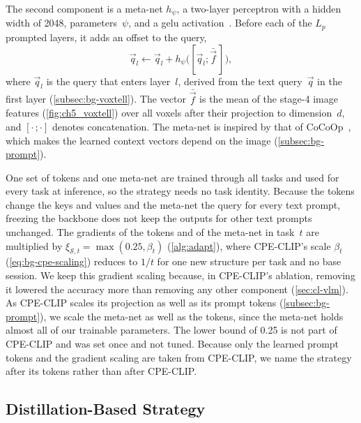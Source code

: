 The second component is a meta-net $h_\psi$, a two-layer perceptron with a hidden width of 2048, parameters~$\psi$, and a \gls{gelu} activation~\cite{hendrycks2016gelu}.
Before each of the $L_p$ prompted layers, it adds an offset to the query,
\begin{equation}
\vec{q}_l \leftarrow \vec{q}_l + h_\psi\big([\vec{q}_l; \bar{\vec{f}}\,]\big),
\label{eq:method-metanet}
\end{equation}
where $\vec{q}_l$ is the query that enters layer~$l$, derived from the text query~$\vec{q}$ in the first layer (\cref{subsec:bg-voxtell}).
The vector $\bar{\vec{f}}$ is the mean of the stage-4 image features (\cref{fig:ch5_voxtell}) over all voxels after their projection to dimension~$d$, and $[\cdot\,;\cdot]$ denotes concatenation.
The meta-net is inspired by that of CoCoOp~\cite{zhou2022cocoop}, which makes the learned context vectors depend on the image (\cref{subsec:bg-prompt}).

One set of tokens and one meta-net are trained through all tasks and used for every task at inference, so the strategy needs no task identity.
Because the tokens change the keys and values and the meta-net the query for every text prompt, freezing the backbone does not keep the outputs for other text prompts unchanged.
The gradients of the tokens and of the meta-net in task~$t$ are multiplied by $\xi_{\mathcal{S},t} = \max(0.25, \beta_t)$ (\cref{alg:adapt}), where CPE-CLIP's scale $\beta_t$ (\cref{eq:bg-cpe-scaling}) reduces to $1/t$ for one new structure per task and no base session.
We keep this gradient scaling because, in CPE-CLIP's ablation, removing it lowered the accuracy more than removing any other component (\cref{sec:cl-vlm}).
As CPE-CLIP scales its projection as well as its prompt tokens (\cref{subsec:bg-prompt}), we scale the meta-net as well as the tokens, since the meta-net holds almost all of our trainable parameters.
The lower bound of 0.25 is not part of CPE-CLIP and was set once and not tuned.
Because only the learned prompt tokens and the gradient scaling are taken from CPE-CLIP, we name the strategy after its tokens rather than after CPE-CLIP.

\subsection{Distillation-Based Strategy}
\label{subsec:method-distillation}


